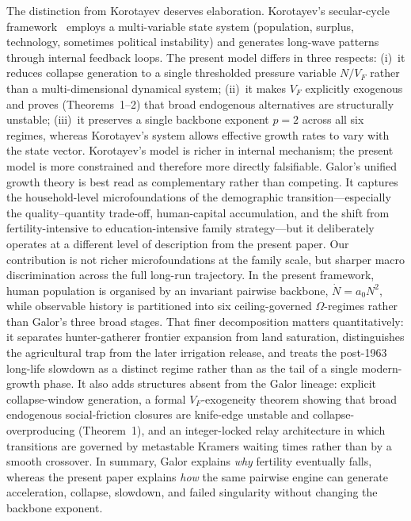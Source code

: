\documentclass[11pt]{article}
\begin{document}
The distinction from Korotayev deserves elaboration.
Korotayev's secular-cycle framework~\cite{korotayev2006} employs a multi-variable state system
(population, surplus, technology, sometimes political instability) and generates long-wave patterns
through internal feedback loops.
The present model differs in three respects:
(i)~it reduces collapse generation to a single thresholded pressure variable $N/V_F$
rather than a multi-dimensional dynamical system;
(ii)~it makes $V_F$ explicitly exogenous and proves (Theorems~1--2)
that broad endogenous alternatives are structurally unstable;
(iii)~it preserves a single backbone exponent $p=2$ across all six regimes,
whereas Korotayev's system allows effective growth rates to vary with the state vector.
Korotayev's model is richer in internal mechanism; the present model is more constrained
and therefore more directly falsifiable.
Galor's unified growth theory is best read as complementary rather than
competing.
It captures the household-level microfoundations of the demographic
transition---especially the quality--quantity trade-off, human-capital
accumulation, and the shift from fertility-intensive to education-intensive
family strategy---but it deliberately operates at a different level of
description from the present paper.
Our contribution is not richer microfoundations at the family scale,
but sharper macro discrimination across the full long-run trajectory.
In the present framework, human population is organised by an invariant
pairwise backbone, $\dot{N}=a_0 N^2$, while observable history is
partitioned into six ceiling-governed $\Omega$-regimes rather than Galor's
three broad stages.
That finer decomposition matters quantitatively:
it separates hunter-gatherer frontier expansion from land saturation,
distinguishes the agricultural trap from the later irrigation release,
and treats the post-1963 long-life slowdown as a distinct regime rather
than as the tail of a single modern-growth phase.
It also adds structures absent from the Galor lineage:
explicit collapse-window generation,
a formal $V_F$-exogeneity theorem showing that broad endogenous
social-friction closures are knife-edge unstable and
collapse-overproducing (Theorem~1),
and an integer-locked relay architecture in which transitions are
governed by metastable Kramers waiting times rather than by a smooth
crossover.
In summary, Galor explains \emph{why} fertility eventually falls,
whereas the present paper explains \emph{how} the same pairwise engine can
generate acceleration, collapse, slowdown, and failed singularity without
changing the backbone exponent.
\end{document}
